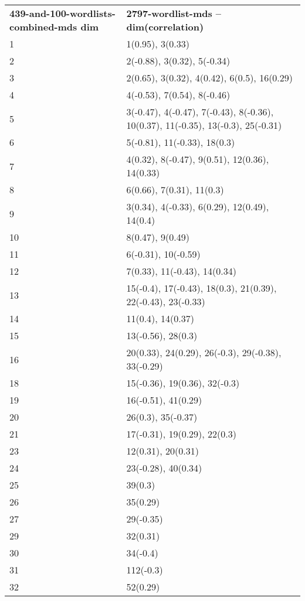 \begin{table}[!tbp]
    \begin{tabular}{| ll |}
        \hline
        \textbf{439-and-100-wordlists-combined-mds dim} & \textbf{2797-wordlist-mds -- dim(correlation)}\\
        1 & 1(0.95), 3(0.33)\\
        2 & 2(-0.88), 3(0.32), 5(-0.34)\\
        3 & 2(0.65), 3(0.32), 4(0.42), 6(0.5), 16(0.29)\\
        4 & 4(-0.53), 7(0.54), 8(-0.46)\\
        5 & 3(-0.47), 4(-0.47), 7(-0.43), 8(-0.36), 10(0.37), 11(-0.35), 13(-0.3), 25(-0.31)\\
        6 & 5(-0.81), 11(-0.33), 18(0.3)\\
        7 & 4(0.32), 8(-0.47), 9(0.51), 12(0.36), 14(0.33)\\
        8 & 6(0.66), 7(0.31), 11(0.3)\\
        9 & 3(0.34), 4(-0.33), 6(0.29), 12(0.49), 14(0.4)\\
        10 & 8(0.47), 9(0.49)\\
        11 & 6(-0.31), 10(-0.59)\\
        12 & 7(0.33), 11(-0.43), 14(0.34)\\
        13 & 15(-0.4), 17(-0.43), 18(0.3), 21(0.39), 22(-0.43), 23(-0.33)\\
        14 & 11(0.4), 14(0.37)\\
        15 & 13(-0.56), 28(0.3)\\
        16 & 20(0.33), 24(0.29), 26(-0.3), 29(-0.38), 33(-0.29)\\
        18 & 15(-0.36), 19(0.36), 32(-0.3)\\
        19 & 16(-0.51), 41(0.29)\\
        20 & 26(0.3), 35(-0.37)\\
        21 & 17(-0.31), 19(0.29), 22(0.3)\\
        23 & 12(0.31), 20(0.31)\\
        24 & 23(-0.28), 40(0.34)\\
        25 & 39(0.3)\\
        26 & 35(0.29)\\
        27 & 29(-0.35)\\
        29 & 32(0.31)\\
        30 & 34(-0.4)\\
        31 & 112(-0.3)\\
        32 & 52(0.29)\\

\end{tabular}
\end{table}
